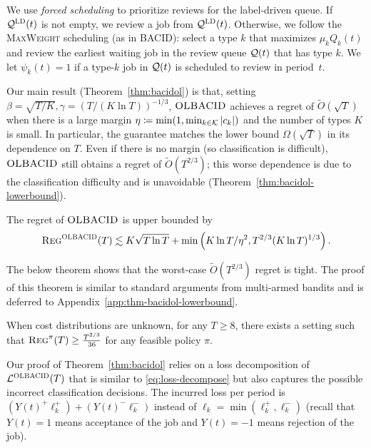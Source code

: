 We use \emph{forced scheduling} to prioritize reviews for the label-driven queue. If $\mathcal{Q}^{\mathcal{\textsc{LD}}}(t)$ is not empty, we review a job from $\mathcal{Q}^{\mathcal{\textsc{LD}}}(t)$. Otherwise, we follow the \textsc{MaxWeight} scheduling (as in \textsc{BACID}): select a type $k$ that maximizes $\mu_{k}Q_{k}(t)$ and review the earliest waiting job in the review queue $\mathcal{Q}(t)$ that has type $k$. We let $\psi_{k}(t) = 1$ if a type-$k$ job in $\mathcal{Q}(t)$ is scheduled to review in period~$t$. 


Our main result (Theorem~\ref{thm:bacidol}) is that, setting $\beta = \sqrt{T / K}, \gamma = (T/(K\ln T))^{-1/3}$, $\textsc{OLBACID}$ achieves a regret of $\tilde{O}(\sqrt{T})$ when there is a large margin $\eta\coloneqq \min(1,\min_{k \in \mathcal{K}} |c_k|)$ and the number of types $K$ is small. In particular, the guarantee matches the lower bound $\Omega(\sqrt{T})$ in its dependence on $T$.  Even if there is no margin (so classification is difficult), $\textsc{OLBACID}$ still obtains a regret of $\tilde{O}(T^{2/3})$; this worse dependence is due to the classification difficulty and is unavoidable (Theorem~\ref{thm:bacidol-lowerbound}). 

\begin{theorem}\label{thm:bacidol}
The regret of $\textsc{OLBACID}$ is upper bounded by 
\[\textsc{Reg}^{\textsc{OLBACID}}(T) \lesssim 
K\sqrt{T\ln T} + \min\left(K\ln T / \eta^2, T^{2/3}(K\ln T)^{1/3}\right).\]
\end{theorem}
The below theorem shows that the worst-case $\tilde{O}(T^{2/3})$ regret is tight. The proof of this theorem is similar to standard arguments from multi-armed bandits and is deferred to Appendix~\ref{app:thm-bacidol-lowerbound}. 
\begin{theorem}\label{thm:bacidol-lowerbound}
When cost distributions are unknown, for any $T \geq 8$, there exists a setting such that $\textsc{Reg}^{\pi}(T)  \geq \frac{T^{2/3}}{36}$ for any feasible policy $\pi$.
\end{theorem}

Our proof of Theorem~\ref{thm:bacidol} relies on a loss decomposition of $\mathcal{L}^{\textsc{OLBACID}}(T)$ that is similar to \eqref{eq:loss-decompose} 
but also captures the possible incorrect classification decisions. The incurred loss per period is $\left(Y(t)^+ \ell_k^{+}\right) + \left(Y(t)^-  \ell_k^{-}\right)$ instead of $\ell_k = \min(\ell_k^{+},\ell_k^{-})$ (recall that $Y(t) = 1$ means acceptance of the job and $Y(t) = -1$ means rejection of the job). 

